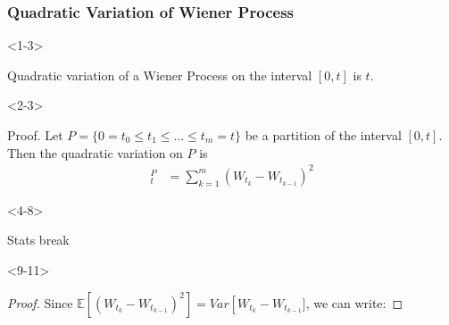 \documentclass[10pt]{beamer}
\begin{document}
\begin{frame}[t]
  \frametitle{Quadratic Variation of Wiener Process}
    \begin{onlyenv}<1-3>
    \begin{theorem}
      Quadratic variation of a Wiener Process on the interval $[0,t]$ is $t$.
    \end{theorem}
    \end{onlyenv}
    \begin{onlyenv}<2-3>
      \begin{block}{Proof.}
        Let $P = \{0 = t_0 \leq t_1 \leq \dots \leq t_m = t\}$ be a partition of the interval $[0,t]$. Then the quadratic variation on $P$ is
        \begin{align*}
          [W]^{P}_{t} &= \displaystyle\sum_{k = 1}^{m}(W_{t_k} - W_{t_{k-1}})^2 
        \end{align*}
      \end{block}
    \end{onlyenv}
    \begin{onlyenv}<4-8>
      \begin{block}{Stats break}
      \end{block}
    \end{onlyenv}
    \begin{onlyenv}<9-11>
      \begin{proof}
        Since $\mathbb{E}[(W_{t_{k}} - W_{t_{k-1}})^2] = Var\left[W_{t_{k}} - W_{t_{k-1}}]$, we can write:

\end{proof}
\end{onlyenv}
\end{frame}
\end{document}
